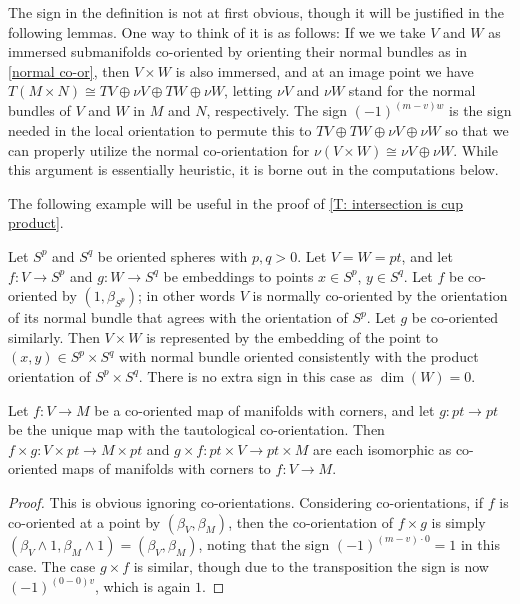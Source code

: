 \begin{remark}
	The sign in the definition is not at first obvious, though it will be justified in the following lemmas.
	One way to think of it is as follows: If we we take $V$ and $W$ as immersed submanifolds co-oriented by orienting their normal bundles as in \cref{normal co-or}, then $V \times W$ is also immersed, and at an image point we have $T(M \times N) \cong TV \oplus \nu V \oplus TW \oplus \nu W$, letting $\nu V$ and $\nu W$ stand for the normal bundles of $V$ and $W$ in $M$ and $N$, respectively.
	The sign $(-1)^{(m-v)w}$ is the sign needed in the local orientation to permute this to $TV \oplus TW \oplus \nu V \oplus \nu W$ so that we can properly utilize the normal co-orientation for $\nu(V \times W) \cong \nu V \oplus \nu W$.
	While this argument is essentially heuristic, it is borne out in the computations below.
\end{remark}

The following example will be useful in the proof of \cref{T: intersection is cup product}.

\begin{example}\label{E: sphere product}
	Let $S^p$ and $S^q$ be oriented spheres with $p,q>0$.
	Let $V = W = pt$, and let $f \colon V \to S^p$ and $g \colon W \to S^q$ be embeddings to points $x \in S^p$, $y \in S^q$.
	Let $f$ be co-oriented by $(1,\beta_{S^p})$; in other words $V$ is normally co-oriented by the orientation of its normal bundle that agrees with the orientation of $S^p$.
	Let $g$ be co-oriented similarly.
	Then $V \times W$ is represented by the embedding of the point to $(x,y) \in S^p \times S^q$ with normal bundle oriented consistently with the product orientation of $S^p \times S^q$.
	There is no extra sign in this case as $\dim(W) = 0$.
\end{example}

\begin{proposition}\label{P: co-oriented exterior unit}
	Let $f \colon V \to M$ be a co-oriented map of manifolds with corners, and let $g:pt \to pt$ be the unique map with the tautological co-orientation.
	Then $f \times g \colon V \times pt \to M \times pt$ and $g \times f:pt \times V \to pt \times M$ are each isomorphic as co-oriented maps of manifolds with corners to $f \colon V \to M$.
\end{proposition}

\begin{proof}
	This is obvious ignoring co-orientations.
	Considering co-orientations, if $f$ is co-oriented at a point by $(\beta_V,\beta_M)$, then the co-orientation of $f \times g$ is simply $(\beta_V \wedge 1,\beta_M \wedge 1) = (\beta_V,\beta_M)$, noting that
	the sign $(-1)^{(m-v)\cdot 0} = 1$ in this case.
	The case $g \times f$ is similar, though due to the transposition the sign is now $(-1)^{(0-0)v}$, which is again $1$.
\end{proof}

